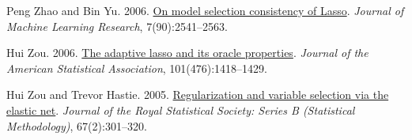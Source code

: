\begin{thebibliography}{}
Peng Zhao and Bin Yu. 2006.
\href{https://jmlr.org/papers/v7/zhao06a.html}{On model selection consistency of Lasso}.
\emph{Journal of Machine Learning Research}, 7(90):2541--2563.

Hui Zou. 2006.
\href{https://doi.org/10.1198/016214506000000735}{The adaptive lasso and its oracle properties}.
\emph{Journal of the American Statistical Association}, 101(476):1418--1429.

Hui Zou and Trevor Hastie. 2005.
\href{https://doi.org/10.1111/j.1467-9868.2005.00503.x}{Regularization and variable selection via the elastic net}.
\emph{Journal of the Royal Statistical Society: Series B (Statistical Methodology)}, 67(2):301--320.

\end{thebibliography}
\endgroup
